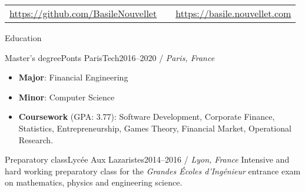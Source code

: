 \documentclass[]{mcdowellcv}
\begin{document}
    \makeheader

    \begin{tabu}
        to 1\textwidth { X[2,l,p] X[c,p] X[2,r,p] }
        {\small \url{https://github.com/BasileNouvellet}} & \textbf{} & {\small \url{https://basile.nouvellet.com}} \\
    \end{tabu}

    \begin{cvsection}{Education}

        \begin{cvsubsection}{Master's degree}{Ponts ParisTech}{2016--2020 / \textit{Paris, France}}
            \begin{itemize}
                \item \textbf{Major}: Financial Engineering
                \item \textbf{Minor}: Computer Science
                \item \textbf{Coursework} (GPA: 3.77): Software Development, Corporate Finance, Statistics, Entrepreneurship, Games Theory, Financial Market, Operational Research.
            \end{itemize}
        \end{cvsubsection}

        \begin{cvsubsection}{Preparatory class}{Lyc\'ee Aux Lazaristes}{2014--2016 / \textit{Lyon, France}}
            Intensive and hard working preparatory class for the \textit{Grandes \'Ecoles d'Ing\'enieur} entrance exam on mathematics, physics and engineering science.
        \end{cvsubsection}

    \end{cvsection}
\end{document}
